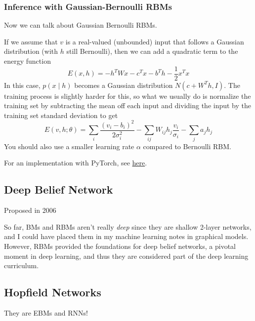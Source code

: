   \subsubsection{Inference with Gaussian-Bernoulli RBMs}

    Now we can talk about Gaussian Bernoulli RBMs. 

    \begin{definition} 
      If we assume that $v$ is a real-valued (unbounded) input that follows a Gaussian distribution (with $h$ still Bernoulli), then we can add a quadratic term to the energy function 
      \begin{equation} 
        E(x, h) = - h^T W x - c^T x - b^T h - \frac{1}{2} x^T x
      \end{equation}
      In this case, $p(x \mid h)$ becomes a Gaussian distribution $N(c + W^T h, I)$. The training process is slightly harder for this, so what we usually do is normalize the training set by subtracting the mean off each input and dividing the input by the training set standard deviation to get  
      \begin{equation} 
        E(v, h; \theta) = \sum_i \frac{(v_i - b_i)^2}{2 \sigma_i^2} - \sum_{ij} W_{ij} h_j \frac{v_i}{\sigma_i} - \sum_j a_j h_j
      \end{equation}
      You should also use a smaller learning rate $\alpha$ compared to Bernoulli RBM. 
    \end{definition} 

    \begin{algo}[Implementation]
      For an implementation with PyTorch, see \href{code/rbm.html}{here}. 
    \end{algo}

\subsection{Deep Belief Network} 

  Proposed in 2006

  So far, BMs and RBMs aren't really \textit{deep} since they are shallow 2-layer networks, and I could have placed them in my machine learning notes in graphical models. However, RBMs provided the foundations for deep belief networks, a pivotal moment in deep learning, and thus they are considered part of the deep learning curriculum. 

\subsection{Hopfield Networks}

  They are EBMs and RNNs!

